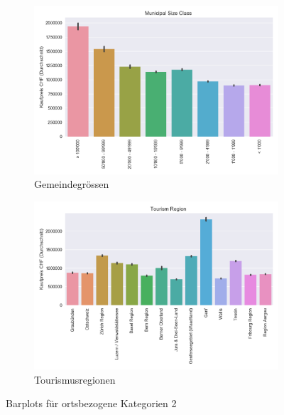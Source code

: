 \begin{figure}[h]
\begin{subfigure}{.5\textwidth}
  \includegraphics[width=\linewidth]{images/anhang/analysis/barplot_municipal_size_class_id.png}
  \caption{Gemeindegrössen}
\end{subfigure}
\begin{subfigure}{.5\textwidth}
  \centering
  \includegraphics[width=\linewidth]{images/anhang/analysis/barplot_tourism_region_id.png}
  \caption{Tourismusregionen} 
\end{subfigure}
\caption{Barplots für ortsbezogene Kategorien 2}
\end{figure}

